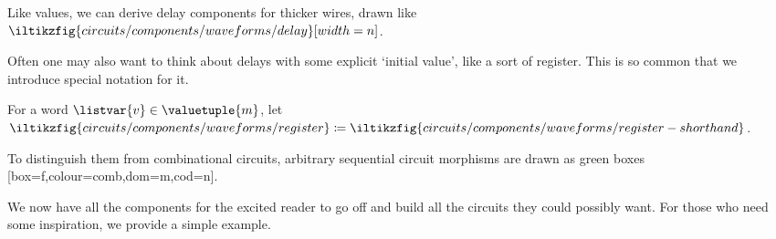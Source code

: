\begin{notation}
    Like values, we can derive delay components for thicker wires, drawn like
    \(
        \iltikzfig{circuits/components/waveforms/delay}[width=n]
    \).
\end{notation}

Often one may also want to think about delays with some explicit `initial
value', like a sort of register.
This is so common that we introduce special notation for it.

\begin{notation}\label{not:register}
    For a word \(\listvar{v} \in \valuetuple{m}\), let \(
        \iltikzfig{circuits/components/waveforms/register}
        \coloneqq
        \iltikzfig{circuits/components/waveforms/register-shorthand}
    \).
\end{notation}

To distinguish them from combinational circuits, arbitrary sequential circuit
morphisms are drawn as green boxes [box=f,colour=comb,dom=m,cod=n].

We now have all the components for the excited reader to go off and build
all the circuits they could possibly want.
For those who need some inspiration, we provide a simple example.


